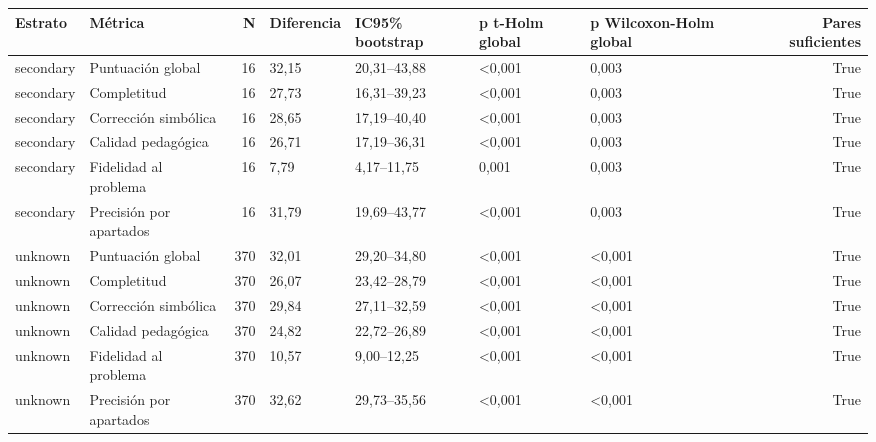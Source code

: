 \begin{tabular}{llrllllr}
\toprule
Estrato & Métrica & N & Diferencia & IC95\% bootstrap & p t-Holm global & p Wilcoxon-Holm global & Pares suficientes \\
\midrule
secondary & Puntuación global & 16 & 32,15 & 20,31–43,88 & <0,001 & 0,003 & True \\
secondary & Completitud & 16 & 27,73 & 16,31–39,23 & <0,001 & 0,003 & True \\
secondary & Corrección simbólica & 16 & 28,65 & 17,19–40,40 & <0,001 & 0,003 & True \\
secondary & Calidad pedagógica & 16 & 26,71 & 17,19–36,31 & <0,001 & 0,003 & True \\
secondary & Fidelidad al problema & 16 & 7,79 & 4,17–11,75 & 0,001 & 0,003 & True \\
secondary & Precisión por apartados & 16 & 31,79 & 19,69–43,77 & <0,001 & 0,003 & True \\
unknown & Puntuación global & 370 & 32,01 & 29,20–34,80 & <0,001 & <0,001 & True \\
unknown & Completitud & 370 & 26,07 & 23,42–28,79 & <0,001 & <0,001 & True \\
unknown & Corrección simbólica & 370 & 29,84 & 27,11–32,59 & <0,001 & <0,001 & True \\
unknown & Calidad pedagógica & 370 & 24,82 & 22,72–26,89 & <0,001 & <0,001 & True \\
unknown & Fidelidad al problema & 370 & 10,57 & 9,00–12,25 & <0,001 & <0,001 & True \\
unknown & Precisión por apartados & 370 & 32,62 & 29,73–35,56 & <0,001 & <0,001 & True \\
\bottomrule
\end{tabular}
